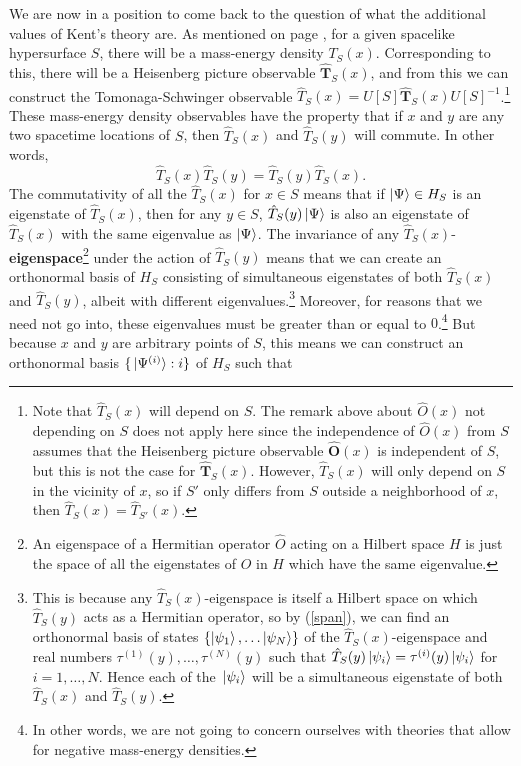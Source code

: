 We are now in a position to come back to the question of what the additional values of Kent's theory are. As mentioned on page \pageref{massenergydensity}, for a given spacelike hypersurface $S$,  there will be a mass-energy density $T_S(x)$. Corresponding to this, there will be a Heisenberg picture observable $\hat{\bm{T}}_S(x)$, and from this we can construct the Tomonaga-Schwinger observable $\hat{T}_S(x)=U[S]\hat{\bm{T}}_S(x)U[S]^{-1}$.\footnote{Note that $\hat{T}_S(x)$ will depend on $S$. The remark above about $\hat{O}(x)$ not depending on $S$ does not apply here since the independence of $\hat{O}(x)$ from $S$ assumes that the Heisenberg picture observable $\hat{\bm{O}}(x)$ is independent of $S$, but this is not the case for  $\hat{\bm{T}}_S(x)$. However,  $\hat{T}_S(x)$ will only depend on $S$ in the vicinity of $x$, so if $S'$ only differs from $S$ outside a neighborhood of $x$, then $\hat{T}_S(x) =\hat{T}_{S'}(x)$.} These mass-energy density observables have the property that if $x$ and $y$ are any two spacetime locations of $S$, then $\hat{T}_S(x)$ and $\hat{T}_S(y)$ will commute. In other words,
$$\hat{T}_S(x)\hat{T}_S(y)=\hat{T}_S(y)\hat{T}_S(x).$$
The commutativity of all the $\hat{T}_S(x)$ for $x\in S$ means that if $\ket{\Psi}\in H_S$ is an eigenstate of $\hat{T}_S(x)$, then for any $y\in S$, $\hat{T}_S(y)\ket{\Psi}$ is also an eigenstate of  $\hat{T}_S(x)$ with the same eigenvalue as $\ket{\Psi}$. The invariance of any $\hat{T}_S(x)$-\textbf{eigenspace}\footnote{An eigenspace of a Hermitian operator $\hat{O}$ acting on a Hilbert space $H$ is just the space of all the eigenstates of $\hat{O}$ in $H$ which have the same eigenvalue.} under the action of   $\hat{T}_S(y)$ means that we can create an orthonormal basis of $H_S$ consisting of simultaneous eigenstates of both  $\hat{T}_S(x)$ and  $\hat{T}_S(y)$, albeit with different eigenvalues.\footnote{This is because any $\hat{T}_S(x)$-eigenspace is itself a Hilbert space on which $\hat{T}_S(y)$ acts as a Hermitian operator, so by (\ref{span}), we can find an orthonormal basis of states $\{\ket{\psi_1},\ldots\ket{\psi_N}\}$ of the $\hat{T}_S(x)$-eigenspace and real numbers $\tau^{(1)}(y),\ldots,\tau^{(N)}(y)$ such that $\hat{T}_S(y)\ket*{\psi_i}=\tau^{(i)}(y)\ket*{\psi_i}$ for $i=1,\ldots,N.$ Hence each of the $\ket*{\psi_i}$ will be a simultaneous eigenstate of both $\hat{T}_S(x)$ and $\hat{T}_S(y)$.} Moreover, for reasons that we need not go into, these eigenvalues must be greater than or equal to $0$.\footnote{In other words, we are not going to concern ourselves with theories that allow for negative mass-energy densities.} But because $x$ and $y$ are arbitrary points of $S$, this means  we can construct an orthonormal basis $\{\ket*{\Psi^{(i)}}:i\}$ of $H_S$ such that
